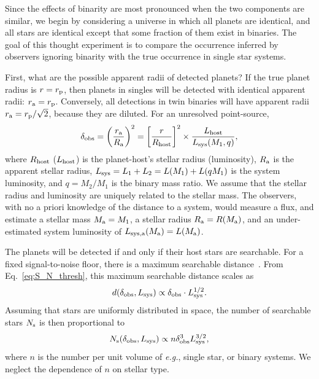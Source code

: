 \documentclass[12pt,modern]{aastex61}
\renewcommand{\a}{_{\rm a}}
\newcommand{\s}{_{\rm s}}
\newcommand{\p}{_{\rm p}}
\begin{document}
Since the effects of binarity are most pronounced when the two components are 
similar, we begin by considering a universe in which all planets are 
identical, and all stars are identical except that some fraction of them exist 
in binaries. The goal of this thought experiment is to compare the occurrence 
inferred by observers ignoring binarity with the true occurrence in single 
star systems.

First, what are the possible apparent radii of detected planets?
If the true planet radius is $r=r\p$, then planets in singles will be 
detected with identical apparent radii: $r\a = r\p$.
Conversely, all detections in twin binaries will have apparent radii 
$r\a=r\p/\sqrt{2}$, because they are diluted.
For an unresolved point-source,
\begin{equation}
\delta_{\rm obs}
= \left(\frac{r\a}{R\a}\right)^2
= \left[{r\over R_{\rm host}}\right]^2\times {L_{\rm host} \over L_{\rm 
        sys}(M_1, q)},
\label{eq:delta_obs_general} 
\end{equation}
where $R_{\rm host}$ ($L_{\rm host}$) is the planet-host's stellar radius 
(luminosity), $R\a$ is the apparent stellar radius, $L_{\rm sys}=L_1+L_2 = 
L(M_1) + L(qM_1)$ is the system luminosity, and $q=M_2/M_1$ is the binary mass 
ratio.
We assume that the stellar radius and luminosity are uniquely related to the 
stellar mass.
The observers, with no a priori knowledge of the distance to a system, would 
measure a flux, and estimate a stellar mass $M\a=M_1$, a stellar 
radius $R\a = R(M\a)$, and an under-estimated system luminosity of $L_{\rm 
sys,a}(M\a) = L(M\a)$.

The planets will be detected if and only if their host stars are searchable.
For a fixed signal-to-noise floor, there is a maximum searchable 
distance~\citep{pepper_using_2003,pepper_searching_2005}.
From Eq.~\ref{eq:S_N_thresh}, this maximum searchable distance scales as
\begin{equation}
d(\delta_{\rm obs}, L_{\rm sys}) \propto \delta_{\rm obs} \cdot L_{\rm 
    sys}^{1/2}.
\end{equation}
Assuming that stars are uniformly distributed in space, the number 
of searchable stars $N\s$ is then proportional to
\begin{equation}
N\s(\delta_{\rm obs}, L_{\rm sys}) \propto n \delta_{\rm obs}^3 L_{\rm 
    sys}^{3/2},
\label{eq:N_searchable_prop}
\end{equation}
where $n$ is the number per unit volume of {\it e.g.}, single star, or binary 
systems.
We neglect the dependence of $n$ on stellar type.
\end{document}
